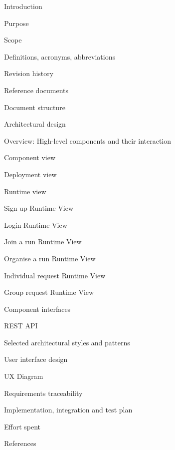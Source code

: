 \documentclass{article}
\begin{document}
	\begin{legal}
 	\item Introduction
  		\begin{legal}
    		\item Purpose
		\item Scope
		\item Definitions, acronyms, abbreviations
		\item Revision history
		\item Reference documents
		\item Document structure	
  		\end{legal}
	\item Architectural design
  		\begin{legal}
    	\item Overview: High-level components and their interaction
		\item Component view
		\item Deployment view
		\item Runtime view
			\begin{legal}
			\item Sign up Runtime View
			\item Login Runtime View
			\item Join a run Runtime View
			\item Organise a run Runtime View
			\item Individual request Runtime View
			\item Group request Runtime View
	  		\end{legal}
		\item Component interfaces
			\begin{legal}
			\item REST API
	  		\end{legal}
		\item Selected architectural styles and patterns
  		\end{legal}
	\item User interface design
  		\begin{legal}
    		\item UX Diagram
  		\end{legal}
	\item Requirements traceability
	\item Implementation, integration and test plan
  	\item Effort spent
	\item References
	\end{legal}
	
	\newpage
	\begin{legal}
	\item {}
	\item{}
	\newpage
	\item{}
	\newpage
	\item{}
	\newpage
	\item{}
	\newpage
	\item{}
	\newpage
	\item{}
	\end{legal}
\end{document}
